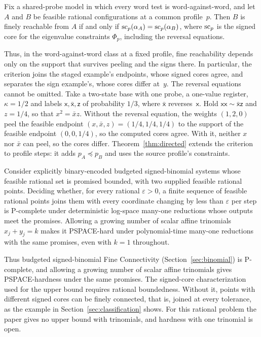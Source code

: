 \begin{theorem}\label{thm:fixed-profile}
Fix a shared-probe model in which every word test is word-against-word, and
let $A$ and $B$ be feasible rational configurations at a common
profile~$p$. Then $B$ is finely reachable from $A$ if and only if
$\operatorname{sc}_p(\alpha_A)=\operatorname{sc}_p(\alpha_B)$, where $\operatorname{sc}_p$ is the signed core for the
eigenvalue constraints $\Phi_p$, including the reversal equations.
\end{theorem}

Thus, in the word-against-word class at a fixed profile, fine
reachability depends only on the support that survives peeling and the
signs there. In particular, the criterion joins the staged
example's endpoints, whose signed cores agree, and separates the sign
example's, whose cores differ at~$y$. The reversal equations cannot be
omitted. Take a two-state base with one probe, a one-value register,
$\kappa=1/2$ and labels $\mathsf x,\bar{\mathsf x},\mathsf z$ of probability
$1/3$, where $\bar{\mathsf x}$ reverses~$\mathsf x$. Hold
$\mathsf{xx}\sim\bar{\mathsf x}\mathsf z$ and $z=1/4$, so that $x^2=\bar xz$.
Without the reversal equation, the weights $(1,2,0)$ peel the feasible
endpoint $(x,\bar x,z)=(1/4,1/4,1/4)$ to the support of the feasible
endpoint $(0,0,1/4)$, so the computed cores agree. With it, neither $x$
nor $\bar x$ can peel, so the cores differ. Theorem~\ref{thm:directed}
extends the criterion to profile steps: it adds $p_A\preceq p_B$ and uses
the source profile's constraints.

\begin{corollary}\label{cor:algebraic}
Consider explicitly binary-encoded budgeted signed-binomial systems whose
feasible rational set is promised bounded, with two supplied feasible
rational points. Deciding whether, for every rational $\varepsilon>0$, a
finite sequence of feasible rational points joins them with every
coordinate changing by less than $\varepsilon$ per step is P-complete under
deterministic log-space many-one reductions whose outputs meet the
promises. Allowing a growing number of scalar affine trinomials
$x_j+y_j=k$ makes it PSPACE-hard under polynomial-time many-one reductions
with the same promises, even with $k=1$ throughout.
\end{corollary}

Thus budgeted signed-binomial Fine Connectivity
(Section~\ref{sec:binomial}) is P-complete, and allowing a
growing number of scalar affine trinomials gives PSPACE-hardness under the
same promises. %
The signed-core characterization used for the upper bound requires
rational boundedness. Without it, points with different signed cores can
be finely connected, that is, joined at every tolerance, as the example in
Section~\ref{sec:classification} shows.
For this rational problem the paper gives no upper bound with trinomials,
and hardness with one trinomial is open.
